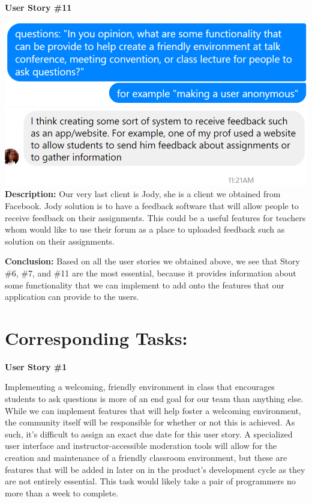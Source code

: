 \documentclass[12pt]{article}
\begin{document}
\textbf{User Story \#11}
\begin{flushleft}
\includegraphics[width=\textwidth]{Assignment5_userstory_11a.eps}
\includegraphics[width=\textwidth]{Assignment5_userstory_11b.eps}
\textbf{Description:} Our very last client is Jody, she is a client we obtained from Facebook. Jody solution is to have a feedback software that will allow people to receive feedback on their assignments. This could be a useful features for teachers whom would like to use their forum as a place to uploaded feedback such as solution on their assignments. \newline
\end{flushleft}

\textbf{Conclusion:} Based on all the user stories we obtained above, we see that Story \#6, \#7, and \#11 are the most essential, because it provides information about some functionality that we can implement to add onto the features that our application can provide to the users. 

\section{Corresponding Tasks:}
\textbf{User Story \#1}
\begin{flushleft}
Implementing a welcoming, friendly environment in class that encourages students to ask questions is more of an end goal for our team than anything else. While we can implement features that will help foster a welcoming environment, the community itself will be responsible for whether or not this is achieved. As such, it's difficult to assign an exact due date for this user story. A specialized user interface and instructor-accessible moderation tools will allow for the creation and maintenance of a friendly classroom environment, but these are features that will be added in later on in the product's development cycle as they are not entirely essential. This task would likely take a pair of programmers no more than a week to complete.
\newline
\end{flushleft}
\end{document}
